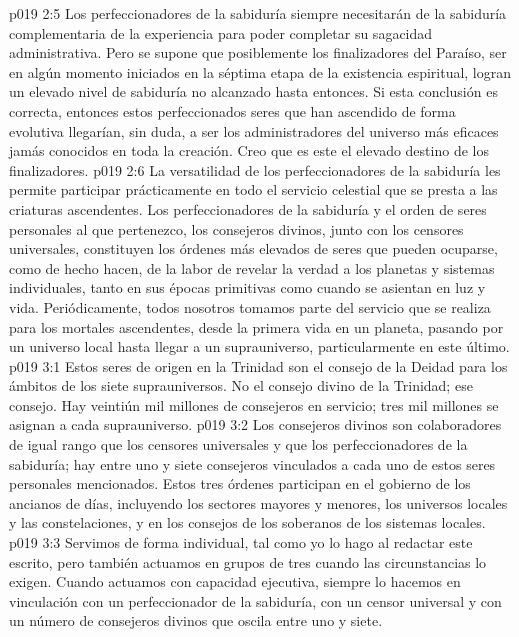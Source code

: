 \vs p019 2:5 Los perfeccionadores de la sabiduría siempre necesitarán de la sabiduría complementaria de la experiencia para poder completar su sagacidad administrativa. Pero se supone que posiblemente los finalizadores del Paraíso,  ser en algún momento iniciados en la séptima etapa de la existencia espiritual, logran un elevado nivel de sabiduría no alcanzado hasta entonces. Si esta conclusión es correcta, entonces estos perfeccionados seres que han ascendido de forma evolutiva llegarían, sin duda, a ser los administradores del universo más eficaces jamás conocidos en toda la creación. Creo que es este el elevado destino de los finalizadores.
\vs p019 2:6 \pc La versatilidad de los perfeccionadores de la sabiduría les permite participar prácticamente en todo el servicio celestial que se presta a las criaturas ascendentes. Los perfeccionadores de la sabiduría y el orden de seres personales al que pertenezco, los consejeros divinos, junto con los censores universales, constituyen los órdenes más elevados de seres que pueden ocuparse, como de hecho hacen, de la labor de revelar la verdad a los planetas y sistemas individuales, tanto en sus épocas primitivas como cuando se asientan en luz y vida. Periódicamente, todos nosotros tomamos parte del servicio que se realiza para los mortales ascendentes, desde la primera vida en un planeta, pasando por un universo local hasta llegar a un suprauniverso, particularmente en este último.
\vs p019 3:1 Estos seres de origen en la Trinidad son el consejo de la Deidad para los ámbitos de los siete suprauniversos. No  el consejo divino de la Trinidad;  ese consejo. Hay veintiún mil millones de consejeros en servicio; tres mil millones se asignan a cada suprauniverso.
\vs p019 3:2 Los consejeros divinos son colaboradores de igual rango que los censores universales y que los perfeccionadores de la sabiduría; hay entre uno y siete consejeros vinculados a cada uno de estos seres personales mencionados. Estos tres órdenes participan en el gobierno de los ancianos de días, incluyendo los sectores mayores y menores, los universos locales y las constelaciones, y en los consejos de los soberanos de los sistemas locales.
\vs p019 3:3 Servimos de forma individual, tal como yo lo hago al redactar este escrito, pero también actuamos en grupos de tres cuando las circunstancias lo exigen. Cuando actuamos con capacidad ejecutiva, siempre lo hacemos en vinculación con un perfeccionador de la sabiduría, con un censor universal y con un número de consejeros divinos que oscila entre uno y siete.
